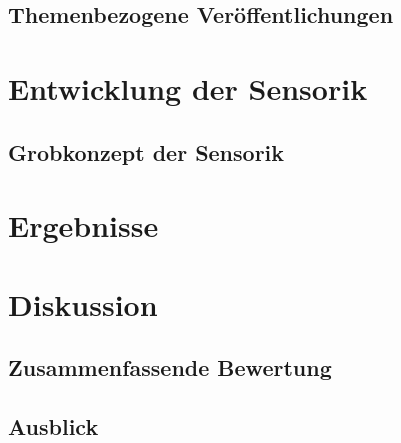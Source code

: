 \section{Themenbezogene Veröffentlichungen}\label{sec:themenbezogene_veroeffentlichungen}

\chapter{Entwicklung der Sensorik}\label{chap:entwicklung}
\section{Grobkonzept der Sensorik}\label{sec:grobkonzept}

\chapter{Ergebnisse}\label{sec:ergebnisse}

\chapter{Diskussion}\label{sec:diskussion}
\section{Zusammenfassende Bewertung}\label{sec:überschrift}

\section{Ausblick}\label{sec:ausblick}